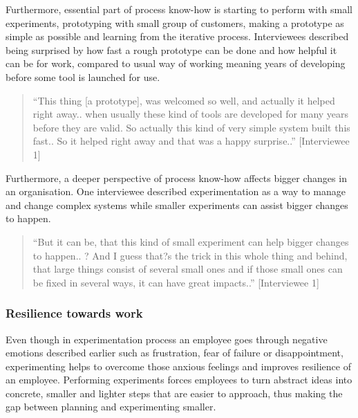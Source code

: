 Furthermore, essential part of process know-how is starting to perform with small experiments, prototyping with small group of customers, making a prototype as simple as possible and learning from the iterative process. Interviewees described being surprised by how fast a rough prototype can be done and how helpful it can be for work, compared to usual way of working meaning years of developing before some tool is launched for use. 
\begin{quote}
``This thing [a prototype], was welcomed so well, and actually it helped right away.. when usually these kind of tools are developed for many years before they are valid. So actually this kind of very simple system built this fast.. So it helped right away and that was a happy surprise..'' [Interviewee 1]
\end{quote}
Furthermore, a deeper perspective of process know-how affects bigger changes in an organisation. One interviewee described experimentation as a way to manage and change complex systems while smaller experiments can assist bigger changes to happen. 
\begin{quote}
``But it can be, that this kind of small experiment can help bigger changes to happen.. ? And I guess that?s the trick in this whole thing and behind, that large things consist of several small ones and if those small ones can be fixed in several ways, it can have great impacts..'' [Interviewee 1]
\end{quote}

\subsubsection{Resilience towards work}
Even though in experimentation process an employee goes through negative emotions described earlier such as frustration, fear of failure or disappointment, experimenting helps to overcome those anxious feelings and improves resilience of an employee.  Performing experiments forces employees to turn abstract ideas into concrete, smaller and lighter steps that are easier to approach, thus making the gap between planning and experimenting smaller.  

